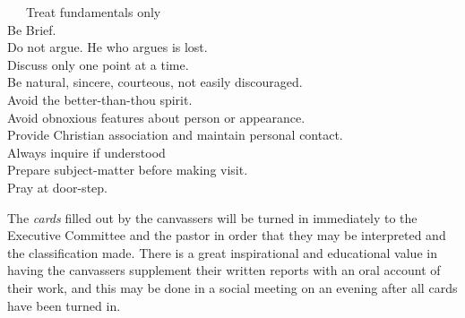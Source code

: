 \documentclass[
]{book}
\begin{document}
~~~Treat fundamentals only\\
\hspace*{0.333em}\hspace*{0.333em}\hspace*{0.333em}Be Brief.\\
\hspace*{0.333em}\hspace*{0.333em}\hspace*{0.333em}Do not argue. He who argues is lost.\\
\hspace*{0.333em}\hspace*{0.333em}\hspace*{0.333em}Discuss only one point at a time.\\
\hspace*{0.333em}\hspace*{0.333em}\hspace*{0.333em}Be natural, sincere, courteous, not easily discouraged.\\
\hspace*{0.333em}\hspace*{0.333em}\hspace*{0.333em}Avoid the better-than-thou spirit.\\
\hspace*{0.333em}\hspace*{0.333em}\hspace*{0.333em}Avoid obnoxious features about person or appearance.\\
\hspace*{0.333em}\hspace*{0.333em}\hspace*{0.333em}Provide Christian association and maintain personal contact.\\
\hspace*{0.333em}\hspace*{0.333em}\hspace*{0.333em}Always inquire if understood\\
\hspace*{0.333em}\hspace*{0.333em}\hspace*{0.333em}Prepare subject-matter before making visit.\\
\hspace*{0.333em}\hspace*{0.333em}\hspace*{0.333em}Pray at door-step.

The \emph{cards} filled out by the canvassers will be turned in immediately to the Executive Committee and the pastor in order that they may be interpreted and the classification made. There is a great inspirational and educational value in having the canvassers supplement their written reports with an oral account of their work, and this may be done in a social meeting on an evening after all cards have been turned in.
\end{document}
